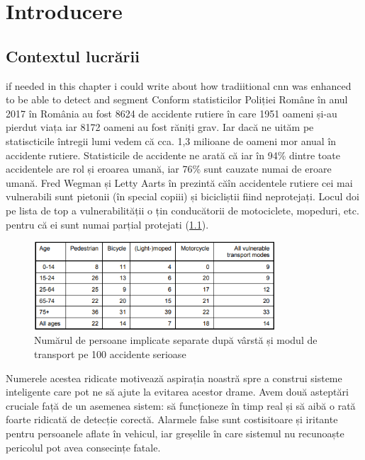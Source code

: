 
\chapter{Introducere}
\label{cap:Introducere}
 \section{Contextul lucrării}
if needed in this chapter i could write about how tradiitional cnn was enhanced to be able to detect and segment \newline
Conform statisticilor Poliției Române \cite{politia_romana}  în anul 2017 în România au fost 8624 de accidente rutiere în care 1951 oameni și-au pierdut viața iar 8172 oameni au fost răniți grav. Iar dacă ne uităm pe statiscticile întregii lumi \cite{WHO}  vedem că cca. 1,3 milioane de oameni mor anual în accidente rutiere.\newline
Statisticile de accidente ne arată că iar în 94\% dintre toate accidentele are rol și eroarea umană, iar 76\% sunt cauzate numai de eroare umană.
 Fred Wegman și Letty Aarts  în \cite{SWOV} prezintă căîn accidentele rutiere cei mai vulnerabili sunt pietonii (în special copiii) și bicicliștii fiind neprotejați. Locul doi pe lista de top a vulnerabilității o țin conducătorii de motociclete, mopeduri, etc. pentru că ei sunt numai parțial protejati (\ref{fig:lethalities}).\newline
\begin{figure}[h!]
    	\centering
	\captionsetup{justification=centering, margin=2cm}
	\includegraphics[width=0.8\textwidth]{figures/lethality_rates.png}
	\caption{Numărul de persoane implicate separate după vârstă și modul de transport pe 100 accidente serioase \cite{SWOV}}
	\label{fig:lethalities}
\end{figure}
Numerele acestea ridicate motivează aspirația noastră spre a construi sisteme inteligente care pot ne să ajute la evitarea acestor drame. Avem două asteptări cruciale față de un asemenea sistem: să funcționeze în timp real și să aibă o rată foarte ridicată de detecție corectă. Alarmele false sunt costisitoare și iritante pentru persoanele aflate în vehicul, iar greșelile în care sistemul nu recunoaște pericolul pot avea consecințe fatale.\newline
